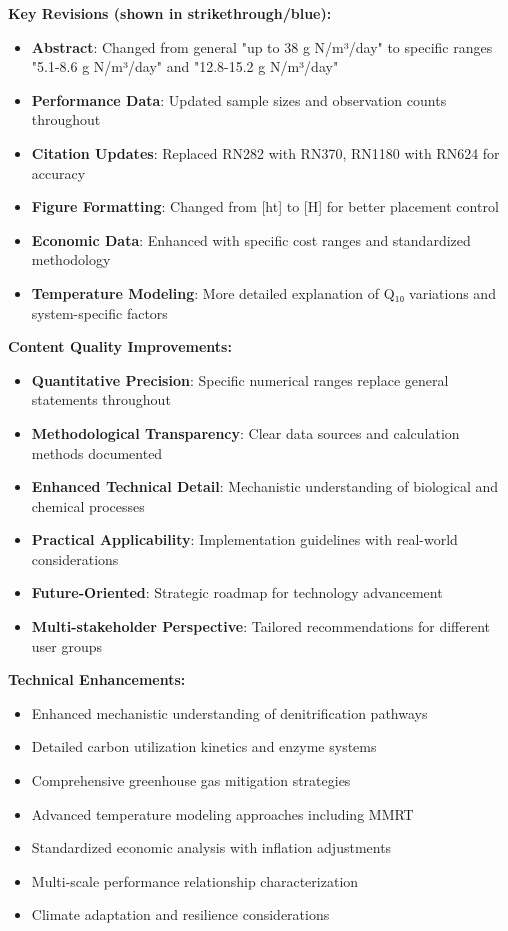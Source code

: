 \documentclass[12pt,a4paper]{article}
\begin{document}
\textbf{\textcolor{replacedtext}{Key Revisions (shown in strikethrough/blue):}}
\begin{itemize}
\item \textbf{Abstract}: Changed from general "up to 38 g N/m³/day" to specific ranges "5.1-8.6 g N/m³/day" and "12.8-15.2 g N/m³/day"
\item \textbf{Performance Data}: Updated sample sizes and observation counts throughout
\item \textbf{Citation Updates}: Replaced RN282 with RN370, RN1180 with RN624 for accuracy
\item \textbf{Figure Formatting}: Changed from [ht] to [H] for better placement control
\item \textbf{Economic Data}: Enhanced with specific cost ranges and standardized methodology
\item \textbf{Temperature Modeling}: More detailed explanation of Q₁₀ variations and system-specific factors
\end{itemize}

\textbf{Content Quality Improvements:}
\begin{itemize}
\item \textbf{Quantitative Precision}: Specific numerical ranges replace general statements throughout
\item \textbf{Methodological Transparency}: Clear data sources and calculation methods documented
\item \textbf{Enhanced Technical Detail}: Mechanistic understanding of biological and chemical processes
\item \textbf{Practical Applicability}: Implementation guidelines with real-world considerations
\item \textbf{Future-Oriented}: Strategic roadmap for technology advancement
\item \textbf{Multi-stakeholder Perspective}: Tailored recommendations for different user groups
\end{itemize}

\textbf{Technical Enhancements:}
\begin{itemize}
\item Enhanced mechanistic understanding of denitrification pathways
\item Detailed carbon utilization kinetics and enzyme systems
\item Comprehensive greenhouse gas mitigation strategies
\item Advanced temperature modeling approaches including MMRT
\item Standardized economic analysis with inflation adjustments
\item Multi-scale performance relationship characterization
\item Climate adaptation and resilience considerations
\end{itemize}
\end{document}
